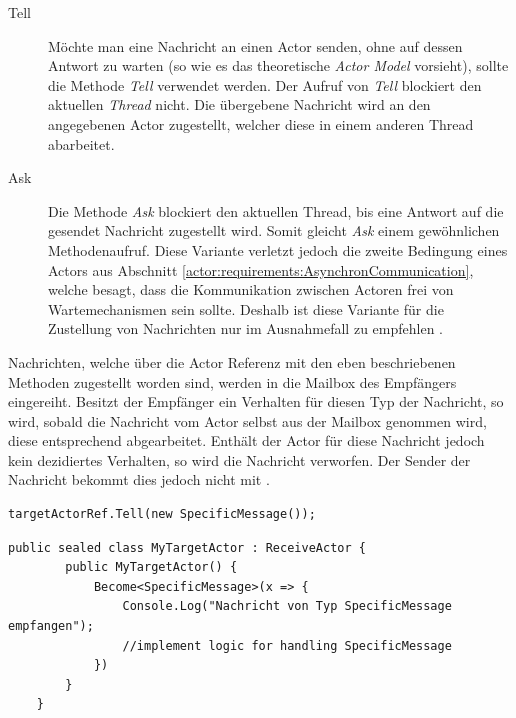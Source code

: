 \begin{description}
    \item[Tell] Möchte man eine Nachricht an einen Actor senden, ohne auf dessen Antwort zu warten (so wie es das theoretische \textit{Actor Model} vorsieht), sollte die Methode \textit{Tell} verwendet werden. Der Aufruf von \textit{Tell} blockiert den aktuellen \textit{Thread} nicht. Die übergebene Nachricht wird an den angegebenen Actor zugestellt, welcher diese in einem anderen Thread abarbeitet. 
    \item[Ask] Die Methode \textit{Ask} blockiert den aktuellen Thread, bis eine Antwort auf die gesendet Nachricht zugestellt wird. Somit gleicht \textit{Ask} einem gewöhnlichen Methodenaufruf. Diese Variante verletzt jedoch die zweite Bedingung eines Actors aus Abschnitt \ref{actor:requirements:AsynchronCommunication}, welche besagt, dass die Kommunikation zwischen Actoren frei von Wartemechanismen sein sollte. Deshalb ist diese Variante für die Zustellung von Nachrichten nur im Ausnahmefall zu empfehlen \citep{Akka.netCommunityAkka.NETDocumentation}.  
\end{description}
Nachrichten, welche über die Actor Referenz mit den eben beschriebenen Methoden zugestellt worden sind, werden in die Mailbox des Empfängers eingereiht. Besitzt der Empfänger ein Verhalten für diesen Typ der Nachricht, so wird, sobald die Nachricht vom Actor selbst aus der Mailbox genommen wird, diese entsprechend abgearbeitet. Enthält der Actor für diese Nachricht jedoch kein de­zi­diertes Verhalten, so wird die Nachricht verworfen. Der Sender der Nachricht bekommt dies jedoch nicht mit \citep{akkaInAction}.  

\begin{lstlisting}[caption=Versenden einer Nachricht an einen anderen Actor, label=code:actor:TellMethod]
    targetActorRef.Tell(new SpecificMessage());
\end{lstlisting}

\begin{lstlisting}[caption=Hier wird für den Actor \textit{MyTargetActor} das Verhalten für eine einkommende Nachricht vom Typ \textit{SpecificMessage} festgelegt., label=lst:test]
    public sealed class MyTargetActor : ReceiveActor {
        public MyTargetActor() {
            Become<SpecificMessage>(x => {
                Console.Log("Nachricht von Typ SpecificMessage empfangen");
                //implement logic for handling SpecificMessage
            })
        }
    }    
\end{lstlisting}

